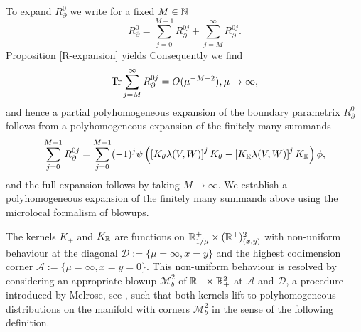 To expand $R^0_\partial$ we write for a fixed $M\in \mathbb{N}$
$$R^0_\partial = \sum_{j=0}^{M-1} R^{0j}_\partial + \sum_{j=M}^\infty R^{0j}_\partial.$$
Proposition \ref{R-expansion} yields 
Consequently we find
\begin{align}
\label{remainder-expansion}
\textup{Tr} \sum_{j=M}^{\infty} R^{0j}_\partial = O(\mu^{-M-2}), \mu \to \infty,
\end{align}
and hence a partial polyhomogeneous expansion of the boundary parametrix $R^0_\partial$ 
follows from a polyhomogeneous expansion of the finitely many summands 
\[
\sum_{j=0}^{M-1} R^{0j}_\partial = \sum_{j=0}^{M-1} (-1)^j \psi \left( \left[K_\theta \lambda(V,W)\right]^j 
K_\theta -  \left[K_{\mathbb{R}} \lambda(V,W)\right]^j K_{\mathbb{R}} \right) \phi, 
\]
and the full expansion follows by taking $M\to \infty$. We establish a polyhomogeneous 
expansion of the finitely many summands above using the microlocal formalism 
of blowups. 

The kernels $K_+$ and $K_{\mathbb{R}}$ are functions on $\mathbb{R}^+_{1/\mu} \times (\mathbb{R}^+)^2_{(x,y)}$ 
with non-uniform behaviour at the diagonal $\mathscr{D}:=\{\mu=\infty, x=y\}$ and 
the highest codimension corner $\mathscr{A}:=\{\mu=\infty, x=y=0\}$. This non-uniform 
behaviour is resolved by considering an appropriate blowup $\mathscr{M}^2_b$ of $\mathbb{R}_+\times \mathbb{R}_+^2$
at $\mathscr{A}$ and $\mathscr{D}$, a procedure introduced by Melrose, see \cite{Mel:APS}, 
such that both kernels lift to polyhomogeneous distributions on the manifold with corners 
$\mathscr{M}^2_b$ in the sense of the following definition.

